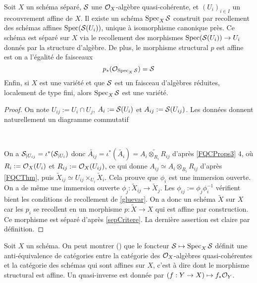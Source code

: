\begin{cons}	\label{relspec}
Soit $X$ un schéma séparé, $\mathcal{S}$ une $\mathcal{O}_X$-algèbre quasi-cohérente, et $(U_i)_{i\in I}$ un recouvrement affine de $X$. Il existe un schéma $\operatorname{Spec}_X \mathcal{S}$ construit par recollement des schémas affines $\operatorname{Spec}(\mathcal{S}(U_i))$, unique à isomorphisme canonique près. Ce schéma est séparé sur $X$ via le recollement des morphismes $\operatorname{Spec}(\mathcal{S}(U_i))\rightarrow U_i$ donnés par la structure d'algèbre. De plus, le morphisme structural $p$ est affine est on a l'égalité de faisceaux
$$p_*(\mathcal{O}_{\operatorname{Spec}_X\mathcal{S}})=\mathcal{S}$$
Enfin, si $X$ est une variété et que $\mathcal{S}$ est un faisceau d'algèbres réduites, localement de type fini, alors $\operatorname{Spec}_X \mathcal{S}$ est une variété.
\end{cons}
\begin{proof}
On note $U_{ij}:=U_i\cap U_j$, $A_i:=\mathcal{S}(U_i)$ et $A_{ij}:=\mathcal{S}(U_{ij})$. Les données donnent naturellement un diagramme commutatif

	\begin{center}
	\\
	\end{center}
	
On a $\mathcal{S}_{|U_{ij}}=\iota^*(\mathcal{S}_{|U_i})$ donc $\widetilde{A_{ij}}=\iota^*(\widetilde{A_i})=\widetilde{A_i \otimes_{R_i}R_{ij}}$ d'après \ref{FQCProps3} $4$, où $R_i:=\mathcal{O}_X(U_i)$ et $R_{ij}:=\mathcal{O}_X(U_{ij})$, ce qui donne $A_{ij}\simeq A_i\otimes_{R_i}R_{ij}$ d'après \ref{FQCThm}, puis $\widetilde{X}_{ij}\simeq U_{ij}\times_{U_i}\widetilde{X}_i$. Cela prouve que $\phi_i$ est une immersion ouverte. On a de même une immersion ouverte $\phi_j:\widetilde{X}_{ij}\rightarrow \widetilde{X}_j$. Les $\phi_{ij}:=\phi_j\phi_i^{-1}$ vérifient bient les conditions de recollement de \ref{gluevar}. On a donc un schéma $\widetilde{X}$ sur $X$ car les $p_i$ se recollent en un morphisme $p:\widetilde{X}\rightarrow X$ qui est affine par construction. Ce morphisme est séparé d'après \ref{sepCritere}. La dernière assertion est claire par définition.
\end{proof}

\begin{rem}
Soit $X$ un schéma. On peut montrer (\cite[12.1]{Gortz}) que le foncteur $\mathcal{S}\mapsto \operatorname{Spec}_X\mathcal{S}$ définit une anti-équivalence de catégories entre la catégorie des $\mathcal{O}_X$-algèbres quasi-cohérentes et la catégorie des schémas qui sont affines sur $X$, c'est à dire dont le morphisme structural est affine. Un quasi-inverse est donnée par $(f:Y\rightarrow X)\mapsto f_*\mathcal{O}_Y$.
\end{rem}


